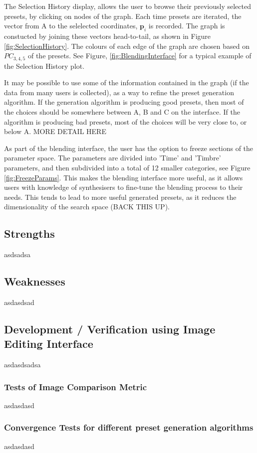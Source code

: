 \documentclass[11pt, oneside]{report}   	%
\renewcommand{\vec}[1]{\mathbf{#1}}
\begin{document}
The Selection History display, allows the user to browse their previously selected presets, by clicking on nodes of the graph. Each time presets are iterated, the vector from A to the selelected coordinates, $\vec{p}_i$ is recorded. The graph is constucted by joining these vectors head-to-tail, as shown in Figure \ref{fig:SelectionHistory}. The colours of each edge of the graph are chosen based on $PC_{3,4,5}$ of the presets. See Figure, \ref{fig:BlendingInterface} for a typical example of the Selection History plot.

It may be possible to use some of the information contained in the graph (if the data from many users is collected), as a way to refine the preset generation algorithm. If the generation algorithm is producing good presets, then most of the choices should be somewhere between A, B and C on the interface. If the algorithm is producing bad presets, most of the choices will be very close to, or below A. MORE DETAIL HERE

As part of the blending interface, the user has the option to freeze sections of the parameter space. The parameters are divided into 'Time' and 'Timbre' parameters, and then subdivided into a total of 12 smaller categories, see Figure \ref{fig:FreezeParams}. This makes the blending interface more useful, as it allows users with knowledge of synthesisers to fine-tune the blending process to their needs. This tends to lead to more useful generated presets, as it reduces the dimensionality of the search space (BACK THIS UP).
\subsection{Strengths}
asdsadsa
\subsection{Weaknesses}
asdasdsad
\subsection{Development / Verification using Image Editing Interface}
asdasdsadsa
\subsubsection{Tests of Image Comparison Metric}
asdasdasd
\subsubsection{Convergence Tests for different preset generation algorithms}
asdasdasd
\end{document}
